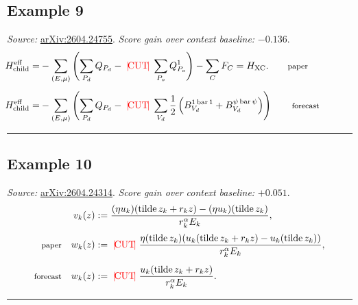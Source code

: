 \documentclass[10pt]{article}
\providecommand{\bar}{\operatorname{bar}}
\providecommand{\tilde}{\operatorname{tilde}}
\begin{document}
\subsection*{Example 9}
\textit{Source:} \href{https://arxiv.org/abs/2604.24755}{arXiv:2604.24755}. \textit{Score gain over context baseline:} \(-0.136\).
\vspace{0.2em}
{\small
\[
\begin{aligned}
&\mathllap{H_\text{child}^\mathrm{eff} =}-\sum_{(E,\mu)}\left(\sum_{P_d} Q_{P_d} -{\color{red}\;|\!\mathrm{CUT}\!|\;}\sum_{P_o} Q_{P_o}^1\right) - \sum_C F_C=H_\text{XC}. \qquad \text{\footnotesize paper}\\[0.45em]
&\mathllap{H_\text{child}^\mathrm{eff} =}-\sum_{(E,\mu)}\left(\sum_{P_d} Q_{P_d} -{\color{red}\;|\!\mathrm{CUT}\!|\;}\sum_{V_d} \frac{1}{2}\left(B^{1\bar{1}}_{V_d}+B^{\psi\bar{\psi}}_{V_d}\right)\right) \qquad \text{\footnotesize forecast}
\end{aligned}
\]
}
\vspace{0.4em}\hrule\vspace{0.8em}

\subsection*{Example 10}
\textit{Source:} \href{https://arxiv.org/abs/2604.24314}{arXiv:2604.24314}. \textit{Score gain over context baseline:} \(+0.051\).
\vspace{0.2em}
{\small
\[
\begin{aligned}
v_k(z)&:=\frac{(\eta u_k)(\tilde{z}_k+r_k z)-(\eta u_k)(\tilde{z}_k)}
{r_k^{\alpha}E_k},\\[0.25em]
\text{\footnotesize paper}\quad
w_k(z)&:={\color{red}\;|\!\mathrm{CUT}\!|\;}
\frac{\eta(\tilde{z}_k)(u_k(\tilde{z}_k+r_k z)-u_k(\tilde{z}_k))}
{r_k^{\alpha}E_k},\\[0.45em]
\text{\footnotesize forecast}\quad
w_k(z)&:={\color{red}\;|\!\mathrm{CUT}\!|\;}
\frac{u_k(\tilde{z}_k+r_k z)}{r_k^{\alpha}E_k}.
\end{aligned}
\]
}
\vspace{0.4em}\hrule\vspace{0.8em}
\end{document}
